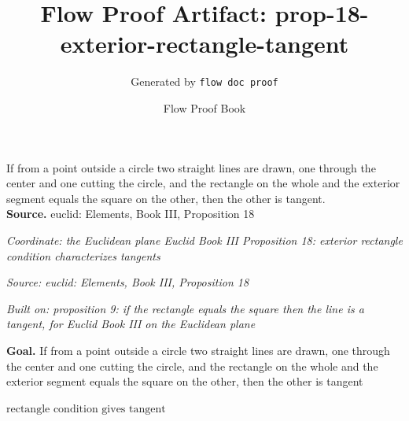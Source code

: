 \documentclass[11pt]{article}
\title{Flow Proof Artifact: prop-18-exterior-rectangle-tangent}
\author{Generated by \texttt{flow doc proof}}
\date{Flow Proof Book}
\theoremstyle{definition}
\begin{document}
\maketitle
If from a point outside a circle two straight lines are drawn, one through the center and one cutting the circle, and the rectangle on the whole and the exterior segment equals the square on the other, then the other is tangent.\\[0.5em]
\textbf{Source.} euclid: Elements, Book III, Proposition 18\\[0.5em]
\bigskip
{}\par
\smallskip\noindent\textit{Coordinate: the Euclidean plane \cdot Euclid Book III \cdot Proposition 18: exterior rectangle condition characterizes tangents}\par
\smallskip\noindent\textit{Source: euclid: Elements, Book III, Proposition 18}\par
\smallskip\noindent\textit{Built on: proposition 9: if the rectangle equals the square then the line is a tangent, for Euclid Book III on the Euclidean plane}\par
\medskip
\noindent\textbf{Goal.} If from a point outside a circle two straight lines are drawn, one through the center and one cutting the circle, and the rectangle on the whole and the exterior segment equals the square on the other, then the other is tangent\par
\noindent$\displaystyle \text{rectangle condition gives tangent}$\par
\medskip
\noindent
\end{document}

